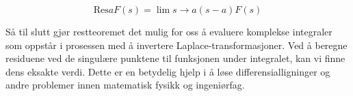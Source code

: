 \begin{equation*}
    \text{Res}{a} F(s) = \lim{s \to a} (s - a)F(s)
\end{equation*}

Så til slutt gjør restteoremet det mulig for oss å evaluere komplekse integraler som oppstår i prosessen med å invertere Laplace-transformasjoner. Ved å beregne residuene ved de singulære punktene til funksjonen under integralet, kan vi finne dens eksakte verdi. Dette er en betydelig hjelp i å løse differensialligninger og andre problemer innen matematisk fysikk og ingeniørfag.